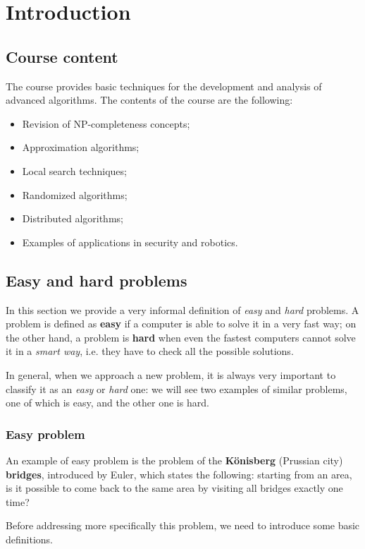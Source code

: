 \section{Introduction}

\subsection{Course content}
The course provides basic techniques for the development and analysis of advanced algorithms. The contents of the course are the following:
\begin{itemize}
    \item Revision of NP-completeness concepts;
    \item Approximation algorithms;
    \item Local search techniques;
    \item Randomized algorithms;
    \item Distributed algorithms;
    \item Examples of applications in security and robotics.
\end{itemize}

\subsection{Easy and hard problems}
In this section we provide a very informal definition of \textit{easy} and \textit{hard} problems. A problem is defined as \textbf{easy} if a computer is able to solve it in a very fast way; on the other hand, a problem is \textbf{hard} when even the fastest computers cannot solve it in a \textit{smart way}, i.e. they have to check all the possible solutions.

In general, when we approach a new problem, it is always very important to classify it as an \textit{easy} or \textit{hard} one: we will see two examples of similar problems, one of which is easy, and the other one is hard.

\subsubsection{Easy problem}
An example of easy problem is the problem of the \textbf{Könisberg} (Prussian city) \textbf{bridges}, introduced by Euler, which states the following: starting from an area, is it possible to come back to the same area by visiting all bridges exactly one time?

Before addressing more specifically this problem, we need to introduce some basic definitions. 

